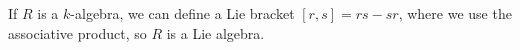 If $R$ is a $k$-algebra, we can define a Lie bracket $[r, s] = rs-sr$, where
we use the associative product, so $R$ is a Lie algebra.

